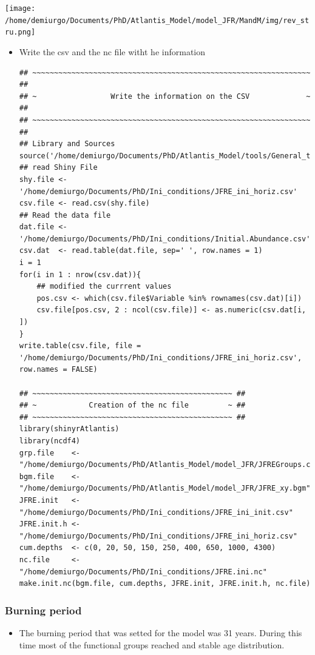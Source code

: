 \documentclass[11pt]{article}
\begin{document}
   \texttt{[image: /home/demiurgo/Documents/PhD/Atlantis\_Model/model\_JFR/MandM/img/rev\_stru.png]}
\begin{itemize}
\item Write the csv and the nc file witht he information

\begin{verbatim}
## ~~~~~~~~~~~~~~~~~~~~~~~~~~~~~~~~~~~~~~~~~~~~~~~~~~~~~~~~~~~~~~~~ ##
## ~                 Write the information on the CSV             ~ ##
## ~~~~~~~~~~~~~~~~~~~~~~~~~~~~~~~~~~~~~~~~~~~~~~~~~~~~~~~~~~~~~~~~ ##
## Library and Sources
source('/home/demiurgo/Documents/PhD/Atlantis_Model/tools/General_tools/Atlantis_tools.R')
## read Shiny File
shy.file <- '/home/demiurgo/Documents/PhD/Ini_conditions/JFRE_ini_horiz.csv'
csv.file <- read.csv(shy.file)
## Read the data file
dat.file <- '/home/demiurgo/Documents/PhD/Ini_conditions/Initial.Abundance.csv'
csv.dat  <- read.table(dat.file, sep=' ', row.names = 1)
i = 1
for(i in 1 : nrow(csv.dat)){
    ## modified the currrent values
    pos.csv <- which(csv.file$Variable %in% rownames(csv.dat)[i])
    csv.file[pos.csv, 2 : ncol(csv.file)] <- as.numeric(csv.dat[i, ])
}
write.table(csv.file, file = '/home/demiurgo/Documents/PhD/Ini_conditions/JFRE_ini_horiz.csv', row.names = FALSE)

## ~~~~~~~~~~~~~~~~~~~~~~~~~~~~~~~~~~~~~~~~~~~~~~ ##
## ~            Creation of the nc file         ~ ##
## ~~~~~~~~~~~~~~~~~~~~~~~~~~~~~~~~~~~~~~~~~~~~~~ ##
library(shinyrAtlantis)
library(ncdf4)
grp.file    <- "/home/demiurgo/Documents/PhD/Atlantis_Model/model_JFR/JFREGroups.csv"
bgm.file    <- "/home/demiurgo/Documents/PhD/Atlantis_Model/model_JFR/JFRE_xy.bgm"
JFRE.init   <- "/home/demiurgo/Documents/PhD/Ini_conditions/JFRE_ini_init.csv"
JFRE.init.h <- "/home/demiurgo/Documents/PhD/Ini_conditions/JFRE_ini_horiz.csv"
cum.depths  <- c(0, 20, 50, 150, 250, 400, 650, 1000, 4300)
nc.file     <- "/home/demiurgo/Documents/PhD/Ini_conditions/JFRE.ini.nc"
make.init.nc(bgm.file, cum.depths, JFRE.init, JFRE.init.h, nc.file)
\end{verbatim}
\end{itemize}
\subsubsection*{Burning period}
\label{sec-6-1}

\begin{itemize}
\item The burning period that was setted for the model was 31 years. During this time most
  of the functional groups reached and stable age distribution.
\end{itemize}
\end{document}
